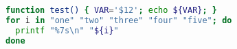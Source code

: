 \documentclass[varwidth,border=5pt]{standalone}
\begin{document}
\begin{lstlisting}[language=bash]
function test() { VAR='$12'; echo ${VAR}; }
for i in "one" "two" "three" "four" "five"; do
  printf "%7s\n" "${i}"
done
\end{lstlisting}
\end{document}
